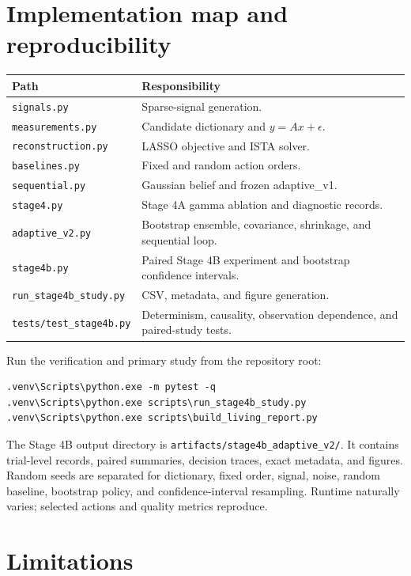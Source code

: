 \documentclass[11pt,a4paper]{article}
\begin{document}
\section{Implementation map and reproducibility}

\begin{center}
\begin{tabular}{p{}p{}}
\hline
Path & Responsibility \\
\hline
\texttt{signals.py} & Sparse-signal generation. \\
\texttt{measurements.py} & Candidate dictionary and $y=Ax+\epsilon$. \\
\texttt{reconstruction.py} & LASSO objective and ISTA solver. \\
\texttt{baselines.py} & Fixed and random action orders. \\
\texttt{sequential.py} & Gaussian belief and frozen adaptive\_v1. \\
\texttt{stage4.py} & Stage 4A gamma ablation and diagnostic records. \\
\texttt{adaptive\_v2.py} & Bootstrap ensemble, covariance, shrinkage, and sequential loop. \\
\texttt{stage4b.py} & Paired Stage 4B experiment and bootstrap confidence intervals. \\
\texttt{run\_stage4b\_study.py} & CSV, metadata, and figure generation. \\
\texttt{tests/test\_stage4b.py} & Determinism, causality, observation dependence, and paired-study tests. \\
\hline
\end{tabular}
\end{center}

Run the verification and primary study from the repository root:
\begin{verbatim}
.venv\Scripts\python.exe -m pytest -q
.venv\Scripts\python.exe scripts\run_stage4b_study.py
.venv\Scripts\python.exe scripts\build_living_report.py
\end{verbatim}

The Stage 4B output directory is
\texttt{artifacts/stage4b\_adaptive\_v2/}.  It contains trial-level records, paired summaries,
decision traces, exact metadata, and figures.  Random seeds are separated for dictionary,
fixed order, signal, noise, random baseline, bootstrap policy, and confidence-interval
resampling.  Runtime naturally varies; selected actions and quality metrics reproduce.

\section{Limitations}
\end{document}
